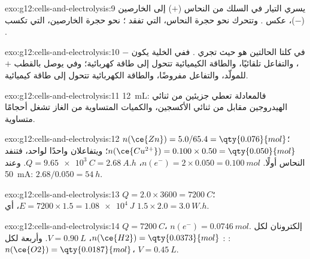 \begin{solution}{exo:g12:cells-and-electrolysis:9}
يسري التيار في السلك من النحاس ($+$) إلى الخارصين ($-$)،
عكس . وتتحرك   نحو حجرة
النحاس، التي تفقد ؛   نحو حجرة
الخارصين، التي تكسب .
\end{solution}

\begin{solution}{exo:g12:cells-and-electrolysis:10}
في كلتا الحالتين  هو حيث تجري . ففي الخلية يكون 
$-$، والتفاعل تلقائيًا، والطاقة الكيميائية تتحول إلى
طاقة كهربائية؛ وفي  يوصل  بالقطب $+$
للمولّد، والتفاعل مفروضًا، والطاقة الكهربائية تتحول إلى
طاقة كيميائية.
\end{solution}

\begin{solution}{exo:g12:cells-and-electrolysis:11}
\qty{12}{mL}: فالمعادلة  تعطي جزيئين من
ثنائي الهيدروجين مقابل  من ثنائي الأكسجين، والكميات المتساوية من الغاز تشغل
أحجامًا متساوية.
\end{solution}

\begin{solution}{exo:g12:cells-and-electrolysis:12}
$n(\ce{Zn}) = 5.0/65.4 = \qty{0.076}{mol}$؛
$n(\ce{Cu^{2+}}) = 0.100 \times 0.50 = \qty{0.050}{mol}$؛ ويتفاعلان
واحدًا لواحد، فتنفد  النحاس أولًا. $n(e^-) = 2 \times 0.050
= \qty{0.100}{mol}$، $Q = \qty{9.65e3}{C} = \qty{2.68}{A.h}$. وعند
\qty{50}{mA}: $2.68/0.050 = \qty{54}{h}$.
\end{solution}

\begin{solution}{exo:g12:cells-and-electrolysis:13}
$Q = 2.0 \times 3600 = \qty{7200}{C}$؛ $E = 7200 \times 1.5 =
\qty{1.08e4}{J}$، أي $1.5 \times 2.0 = \qty{3.0}{W.h}$.
\end{solution}

\begin{solution}{exo:g12:cells-and-electrolysis:14}
$Q = \qty{7200}{C}$، $n(e^-) = \qty{0.0746}{mol}$. إلكترونان لكل
: $n(\ce{H2}) = \qty{0.0373}{mol}$، $V = \qty{0.90}{L}$. وأربعة لكل
: $n(\ce{O2}) = \qty{0.0187}{mol}$، $V = \qty{0.45}{L}$.
\end{solution}

